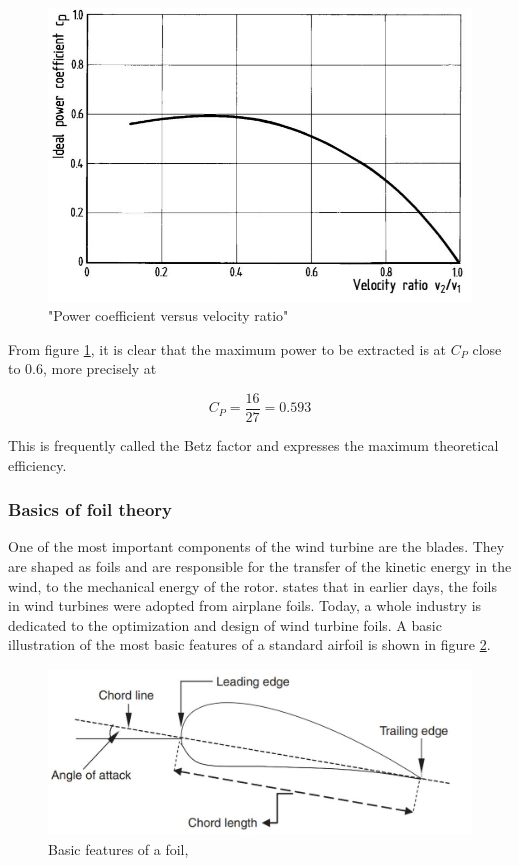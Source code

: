 \begin{figure}[H]
\centering
\includegraphics[scale=0.6]{figures/idealflow}
\caption[$\; \:$Power coefficient versus velocity ratio]{"Power coefficient versus velocity ratio" \cite{Hau2013} }
 \label{fig:idealflow}
\end{figure}

\noindent  From figure \ref{fig:idealflow}, it is clear that the maximum power to be extracted is at $C_P$ close to 0.6, more precisely at 

 \begin{equation}
    C_P = \frac{16}{27} = 0.593
\end{equation}

\noindent This is frequently called the Betz factor and expresses the maximum theoretical efficiency. 

\subsubsection{Basics of foil theory}
One of the most important components of the wind turbine are the blades. They are shaped as foils and are responsible for the transfer of the kinetic energy in the wind, to the mechanical energy of the rotor. \cite{MATHEW2012} states that in earlier days, the foils in wind turbines were adopted from airplane foils. Today, a whole industry is dedicated to the optimization and design of wind turbine foils. A basic illustration of the most basic features of a standard airfoil is shown in figure \ref{fig:foil}.  

\begin{figure}[H]
\centering
\includegraphics[scale=0.6]{figures/foil}
\caption[$\; \:$Basic features of a foil]{Basic features of a foil, \cite{MATHEW2012} }
 \label{fig:foil}
\end{figure}

